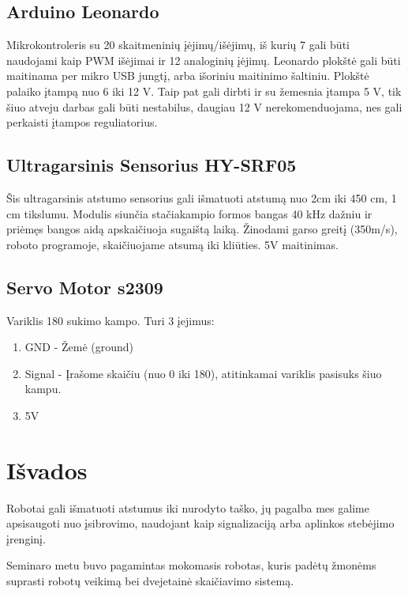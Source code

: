 \documentclass[a4paper, 12pt]{article}
\begin{document}
\begin{center}

\end{center}

\subsection{Arduino Leonardo}
Mikrokontroleris su 20 skaitmeninių įėjimų/išėjimų, iš kurių 7 gali būti naudojami kaip PWM išėjimai ir 12 analoginių įėjimų. Leonardo plokštė gali būti maitinama per mikro USB jungtį, arba išoriniu maitinimo šaltiniu. Plokštė palaiko įtampą nuo 6 iki 12 V. Taip pat gali dirbti ir su žemesnia įtampa 5 V, tik šiuo atveju darbas gali būti nestabilus, daugiau 12 V nerekomenduojama, nes gali perkaisti įtampos reguliatorius.

\subsection{Ultragarsinis Sensorius HY-SRF05}
Šis ultragarsinis atstumo sensorius gali išmatuoti atstumą nuo 2cm iki 450 cm, 1 cm tikslumu. Modulis siunčia stačiakampio formos bangas 40 kHz dažniu ir priėmęs bangos aidą apskaičiuoja sugaištą laiką. Žinodami garso greitį (350m/s), roboto programoje, skaičiuojame atsumą iki kliūties. 5V maitinimas.

\subsection{Servo Motor s2309}
Variklis 180 sukimo kampo. Turi 3 įejimus:
\begin{enumerate}
    \item GND - Žemė (ground)
    \item Signal - Įrašome skaičiu (nuo 0 iki 180), atitinkamai variklis pasisuks šiuo kampu.
    \item 5V
\end{enumerate}

\newpage
\section{Išvados}
Robotai gali išmatuoti atstumus iki nurodyto taško, jų pagalba mes galime apsisaugoti nuo įsibrovimo, naudojant kaip signalizaciją arba aplinkos stebėjimo įrenginį.

Seminaro metu buvo pagamintas mokomasis robotas, kuris padėtų žmonėms suprasti robotų veikimą bei dvejetainė skaičiavimo sistemą.
\end{document}
